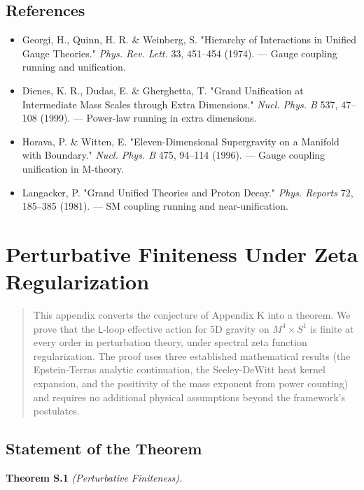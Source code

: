 \documentclass[aps,prd,preprint,superscriptaddress,longbibliography,floatfix]{revtex4-2}
\theoremstyle{remark}
\begin{document}
\subsection{References}


\begin{itemize}
  \item Georgi, H., Quinn, H. R. \& Weinberg, S. "Hierarchy of Interactions in Unified Gauge Theories." \textit{Phys. Rev. Lett.} 33, 451--454 (1974). --- Gauge coupling running and unification.
  \item Dienes, K. R., Dudas, E. \& Gherghetta, T. "Grand Unification at Intermediate Mass Scales through Extra Dimensions." \textit{Nucl. Phys. B} 537, 47--108 (1999). --- Power-law running in extra dimensions.
  \item Horava, P. \& Witten, E. "Eleven-Dimensional Supergravity on a Manifold with Boundary." \textit{Nucl. Phys. B} 475, 94--114 (1996). --- Gauge coupling unification in M-theory.
  \item Langacker, P. "Grand Unified Theories and Proton Decay." \textit{Phys. Reports} 72, 185--385 (1981). --- SM coupling running and near-unification.
\end{itemize}


\section{Perturbative Finiteness Under Zeta Regularization}


\begin{quote}
This appendix converts the conjecture of Appendix K into a theorem. We
prove that the \texttt{L}-loop effective action for 5D gravity on $M^{4} \times S^{1}$ is finite
at every order in perturbation theory, under spectral zeta function
regularization. The proof uses three established mathematical results
(the Epstein-Terras analytic continuation, the Seeley-DeWitt heat kernel
expansion, and the positivity of the mass exponent from power counting)
and requires no additional physical assumptions beyond the framework's
postulates.
\end{quote}



\subsection{Statement of the Theorem}

\textbf{Theorem S.1} \textit{(Perturbative Finiteness).}
\end{document}
